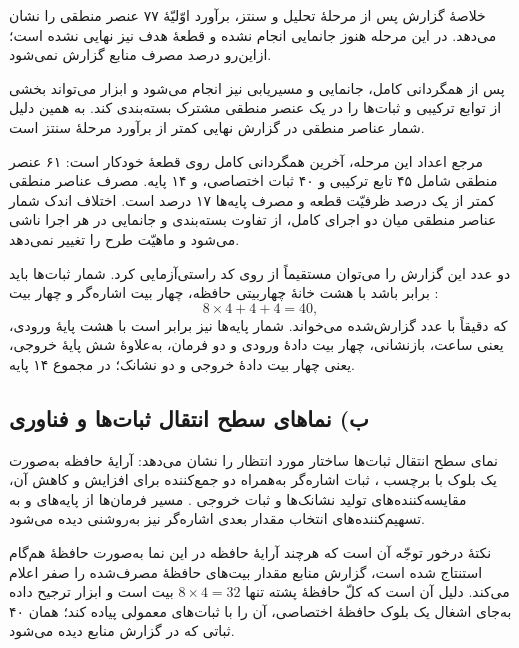 \documentclass[12pt,a4paper]{article}
\begin{document}

	خلاصهٔ گزارش پس از مرحلهٔ تحلیل و سنتز، برآورد اوّلیّهٔ ۷۷ عنصر منطقی را نشان می‌دهد. در این مرحله هنوز جانمایی انجام نشده و قطعهٔ هدف نیز نهایی نشده است؛ ازاین‌رو درصد مصرف منابع گزارش نمی‌شود.


	پس از همگردانی کامل، جانمایی و مسیریابی نیز انجام می‌شود و ابزار می‌تواند بخشی از توابع ترکیبی و ثبات‌ها را در یک عنصر منطقی مشترک بسته‌بندی کند. به همین دلیل شمار عناصر منطقی در گزارش نهایی کمتر از برآورد مرحلهٔ سنتز است.



	مرجع اعداد این مرحله، آخرین همگردانی کامل روی قطعهٔ خودکار است: ۶۱ عنصر منطقی شامل ۴۵ تابع ترکیبی و ۴۰ ثبات اختصاصی، و ۱۴ پایه. مصرف عناصر منطقی کمتر از یک درصد ظرفیّت قطعه و مصرف پایه‌ها ۱۷ درصد است. اختلاف اندک شمار عناصر منطقی میان دو اجرای کامل، از تفاوت بسته‌بندی و جانمایی در هر اجرا ناشی می‌شود و ماهیّت طرح را تغییر نمی‌دهد.

	دو عدد این گزارش را می‌توان مستقیماً از روی کد راستی‌آزمایی کرد. شمار ثبات‌ها باید برابر باشد با هشت خانهٔ چهاربیتی حافظه، چهار بیت اشاره‌گر و چهار بیت :
	\[
	8\times4 + 4 + 4 = 40,
	\]
	که دقیقاً با عدد گزارش‌شده می‌خواند. شمار پایه‌ها نیز برابر است با هشت پایهٔ ورودی، یعنی ساعت، بازنشانی، چهار بیت دادهٔ ورودی و دو فرمان، به‌علاوهٔ شش پایهٔ خروجی، یعنی چهار بیت دادهٔ خروجی و دو نشانک؛ در مجموع ۱۴ پایه.

	\subsection*{ب) نماهای سطح انتقال ثبات‌ها و فناوری}
	نمای سطح انتقال ثبات‌ها ساختار مورد انتظار را نشان می‌دهد: آرایهٔ حافظه به‌صورت یک بلوک با برچسب ، ثبات اشاره‌گر به‌همراه دو جمع‌کننده برای افزایش و کاهش آن، مقایسه‌کننده‌های تولید نشانک‌ها و ثبات خروجی . مسیر فرمان‌ها از پایه‌های  و  به تسهیم‌کننده‌های انتخاب مقدار بعدی اشاره‌گر نیز به‌روشنی دیده می‌شود.


	نکتهٔ درخور توجّه آن است که هرچند آرایهٔ حافظه در این نما به‌صورت حافظهٔ هم‌گام استنتاج شده است، گزارش منابع مقدار بیت‌های حافظهٔ مصرف‌شده را صفر اعلام می‌کند. دلیل آن است که کلّ حافظهٔ پشته تنها \(8\times4=32\) بیت است و ابزار ترجیح داده به‌جای اشغال یک بلوک حافظهٔ اختصاصی، آن را با ثبات‌های معمولی پیاده کند؛ همان ۴۰ ثباتی که در گزارش منابع دیده می‌شود.
\end{document}
